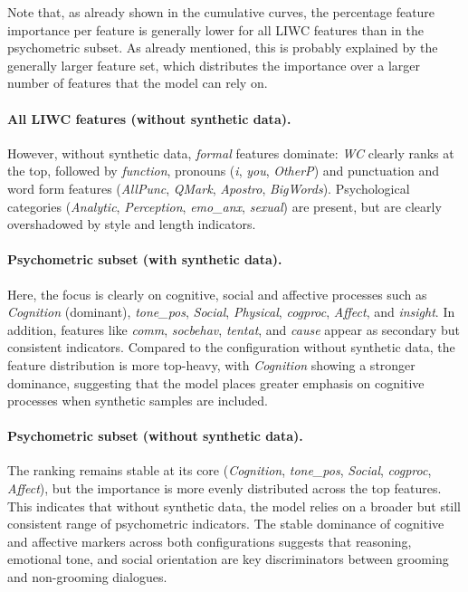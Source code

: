 Note that, as already shown in the cumulative curves, the percentage feature importance per feature is generally lower for all LIWC features than in the psychometric subset. As already mentioned, this is probably explained by the generally larger feature set, which distributes the importance over a larger number of features that the model can rely on.

\paragraph{All LIWC features (without synthetic data).}
However, without synthetic data, \emph{formal} features dominate: \textit{WC} clearly ranks at the top, followed by \textit{function}, pronouns (\textit{i}, \textit{you}, \textit{OtherP}) and punctuation and word form features (\textit{AllPunc}, \textit{QMark}, \textit{Apostro}, \textit{BigWords}). Psychological categories (\textit{Analytic}, \textit{Perception}, \textit{emo\_anx}, \textit{sexual}) are present, but are clearly overshadowed by style and length indicators.
 

\paragraph{Psychometric subset (with synthetic data).}
Here, the focus is clearly on cognitive, social and affective processes such as \textit{Cognition} (dominant), \textit{tone_pos}, \textit{Social}, \textit{Physical}, \textit{cogproc}, \textit{Affect}, and \textit{insight}. In addition, features like \textit{comm}, \textit{socbehav}, \textit{tentat}, and \textit{cause} appear as secondary but consistent indicators. Compared to the configuration without synthetic data, the feature distribution is more top-heavy, with \textit{Cognition} showing a stronger dominance, suggesting that the model places greater emphasis on cognitive processes when synthetic samples are included.

\paragraph{Psychometric subset (without synthetic data).}
The ranking remains stable at its core (\textit{Cognition}, \textit{tone_pos}, \textit{Social}, \textit{cogproc}, \textit{Affect}), but the importance is more evenly distributed across the top features. This indicates that without synthetic data, the model relies on a broader but still consistent range of psychometric indicators. The stable dominance of cognitive and affective markers across both configurations suggests that reasoning, emotional tone, and social orientation are key discriminators between grooming and non-grooming dialogues.

